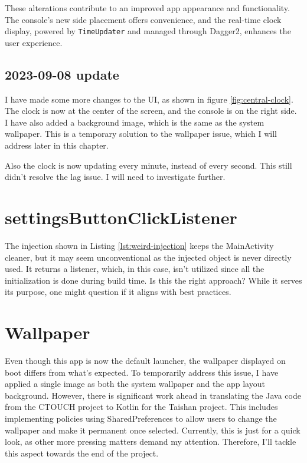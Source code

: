 These alterations contribute to an improved app appearance and functionality. The console's new side placement offers convenience, and the real-time clock display, powered by \texttt{TimeUpdater} and managed through Dagger2, enhances the user experience.

\clearpage
\subsection{2023-09-08 update}

I have made some more changes to the UI, as shown in figure \ref{fig:central-clock}. The clock is now at the center of the screen, and the console is on the right side. I have also added a background image, which is the same as the system wallpaper. This is a temporary solution to the wallpaper issue, which I will address later in this chapter.

\medskip
Also the clock is now updating every minute, instead of every second. This still didn't resolve the lag issue. I will need to investigate further.

\clearpage
\section{settingsButtonClickListener}
The injection shown in Listing \ref{lst:weird-injection} keeps the MainActivity cleaner, but it may seem unconventional as the injected object is never directly used. It returns a listener, which, in this case, isn't utilized since all the initialization is done during build time. Is this the right approach? While it serves its purpose, one might question if it aligns with best practices.


\section{Wallpaper}
Even though this app is now the default launcher, the wallpaper displayed on boot differs from what's expected. To temporarily address this issue, I have applied a single image as both the system wallpaper and the app layout background. However, there is significant work ahead in translating the Java code from the CTOUCH project to Kotlin for the Taishan project. This includes implementing policies using SharedPreferences to allow users to change the wallpaper and make it permanent once selected. Currently, this is just for a quick look, as other more pressing matters demand my attention. Therefore, I'll tackle this aspect towards the end of the project.

